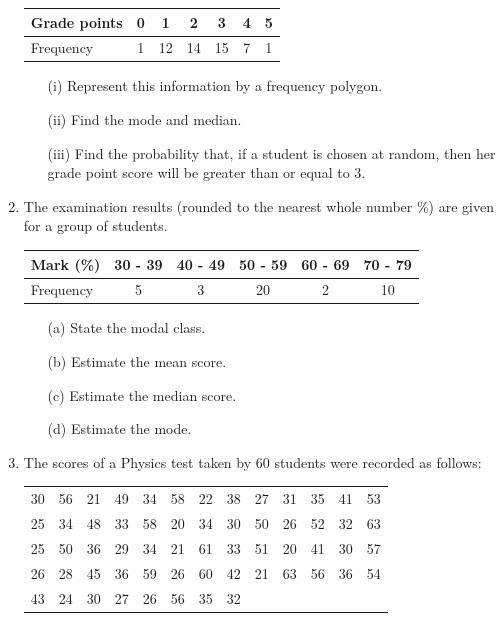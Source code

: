 \begin{enumerate}
	\begin{tabular}{|l|c|c|c|c|c|c|} \hline
	Grade points&0&1&2&3&4&5 \\ \hline
	Frequency&1&12&14&15&7&1 \\ \hline	
	\end{tabular}
	
	\begin{itemize}
	\item[(i)] Represent this information by a frequency polygon. 
	\item[(ii)] Find the mode and median.
	\item[(iii)] Find the probability that, if a student is chosen at random, then her grade point score will be greater than or equal to 3.
	\end{itemize} 
	
	\item The examination results (rounded to the nearest whole number \%) are given for a group of students.\\
	
	\begin{tabular}{|l|c|c|c|c|c|} \hline
	Mark (\%)&30 - 39&40 - 49&50 - 59&60 - 69&70 - 79 \\ \hline
	Frequency &5&3&20&2&10 \\ \hline	
	\end{tabular}
	
	\begin{itemize}
	\item[(a)] State the modal class.
	\item[(b)] Estimate the mean score.
	\item[(c)] Estimate the median score.
	\item[(d)] Estimate the mode.
	\end{itemize} 
	
	\item The scores of a Physics test taken by 60 students were recorded as follows:\\
	
	\begin{tabular}{ccccccccccccc}
	30&56&21&49&34&58&22&38&27&31&35&41&53 \\
	25&34&48&33&58&20&34&30&50&26&52&32&63 \\
	25&50&36&29&34&21&61&33&51&20&41&30&57 \\
	26&28&45&36&59&26&60&42&21&63&56&36&54 \\
	43&24&30&27&26&56&35&32&&&&& \\	
	\end{tabular}
	

\end{enumerate}
